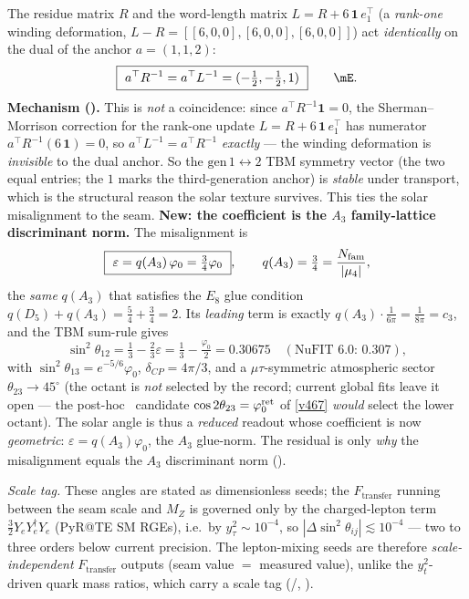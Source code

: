 \begin{keybox}
The residue matrix $R$ and the word-length matrix $L=R+6\,\mathbf 1\,e_1^\top$ (a \emph{rank-one} winding
deformation, $L{-}R=[[6,0,0],[6,0,0],[6,0,0]]$) act \emph{identically} on the dual of the anchor $a=(1,1,2)$:
\[
  \boxed{\ a^\top R^{-1}=a^\top L^{-1}=(-\tfrac12,-\tfrac12,1)\ }\qquad\mE .
\]
\textbf{Mechanism ().} This is \emph{not} a coincidence: since
$a^\top R^{-1}\mathbf 1=0$, the Sherman--Morrison correction for the rank-one update
$L=R+6\,\mathbf 1\,e_1^\top$ has numerator $a^\top R^{-1}(6\,\mathbf1)=0$, so $a^\top L^{-1}=a^\top R^{-1}$
\emph{exactly} --- the winding deformation is \emph{invisible} to the dual anchor. So the
$\mathrm{gen}\,1{\leftrightarrow}2$ TBM symmetry vector (the two equal entries; the $1$ marks the
third-generation anchor) is \emph{stable} under transport, which is the structural reason the solar texture
survives. This ties the solar misalignment to the seam. \textbf{New: the
coefficient is the $A_3$ family-lattice discriminant norm.} The misalignment is
\[
  \boxed{\ \varepsilon=q(A_3)\,\varphi_0=\tfrac34\varphi_0\ },\qquad
  q(A_3)=\tfrac34=\frac{\Nfam}{|\mu_4|},
\]
the \emph{same} $q(A_3)$ that satisfies the $E_8$ glue condition $q(D_5)+q(A_3)=\tfrac54+\tfrac34=2$. Its
\emph{leading} term is exactly $q(A_3)\cdot\tfrac1{6\pi}=\tfrac1{8\pi}=c_3$, and the TBM sum-rule gives
\[
  \sin^2\theta_{12}=\tfrac13-\tfrac23\varepsilon=\tfrac13-\tfrac{\varphi_0}{2}=0.30675
  \quad(\text{NuFIT 6.0: }0.307),
\]
with $\sin^2\theta_{13}=e^{-5/6}\varphi_0$, $\delta_{CP}=4\pi/3$, and a $\mu\tau$-symmetric atmospheric
sector $\theta_{23}\to45^\circ$ (the octant is \emph{not} selected by the record; current global fits leave it
open --- the post-hoc \mO\ candidate $\cos2\theta_{23}=\varphi_0^{\mathrm{ret}}$ of \vref{v467} \emph{would} select the lower octant).
The solar angle is thus a \emph{reduced} readout whose coefficient is now \emph{geometric}:
$\varepsilon=q(A_3)\varphi_0$, the $A_3$ glue-norm. The residual is only \emph{why} the misalignment equals
the $A_3$ discriminant norm
(\mC). \,

\emph{Scale tag.} These angles are stated as dimensionless seeds; the $F_{\mathrm{transfer}}$
running between the seam scale and $M_Z$ is governed only by the charged-lepton term
$\tfrac32 Y_e Y_e^\dagger Y_e$ (PyR@TE SM RGEs), i.e.\ by $y_\tau^2\sim10^{-4}$, so
$|\Delta\sin^2\theta_{ij}|\lesssim10^{-4}$ --- two to three orders below current precision.
The lepton-mixing seeds are therefore \emph{scale-independent} $F_{\mathrm{transfer}}$ outputs
(seam value $=$ measured value), unlike the $y_t^2$-driven quark mass ratios, which carry a
scale tag (\mE/\mC, ).
\end{keybox}


